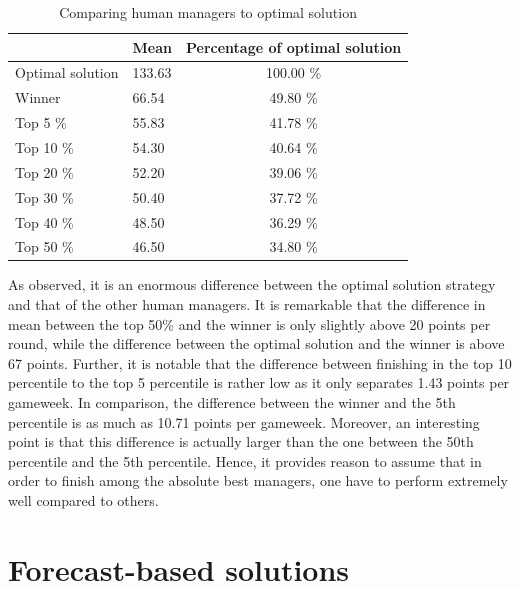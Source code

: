 \begin{table}[H]
\centering
\caption{Comparing human managers to optimal solution}
\label{Optimal_Human}
\begin{tabular}{llc}
\hline
                 & Mean   & \multicolumn{1}{l}{Percentage of optimal solution} \\
\hline                 
Optimal solution & 133.63 & 100.00 \%                                          \\
Winner           & 66.54  & 49.80 \%                                           \\
Top 5 \%         & 55.83  & 41.78 \%                                           \\
Top 10 \%        & 54.30  & 40.64 \%                                           \\
Top 20 \%        & 52.20  & 39.06 \%                                           \\
Top 30 \%        & 50.40  & 37.72 \%                                           \\
Top 40 \%        & 48.50  & 36.29 \%                                           \\
Top 50 \%        & 46.50  & 34.80 \%                                           \\
\hline
\end{tabular}
\end{table}

As observed, it is an enormous difference between the optimal solution strategy and that of the other human managers. It is remarkable that the difference in mean between the top 50\% and the winner is only slightly above 20 points per round, while the difference between the optimal solution and the winner is above 67 points. Further, it is notable that the difference between finishing in the top 10 percentile to the top 5 percentile is rather low as it only separates 1.43 points per gameweek. In comparison, the difference between the winner and the 5th percentile is as much as 10.71 points per gameweek. Moreover, an interesting point is that this difference is actually larger than the one between the 50th percentile and the 5th percentile. Hence, it provides reason to assume that in order to finish among the absolute best managers, one have to perform extremely well compared to others. 
\newpar
 


\section{Forecast-based solutions}\label{sec:inexact}

